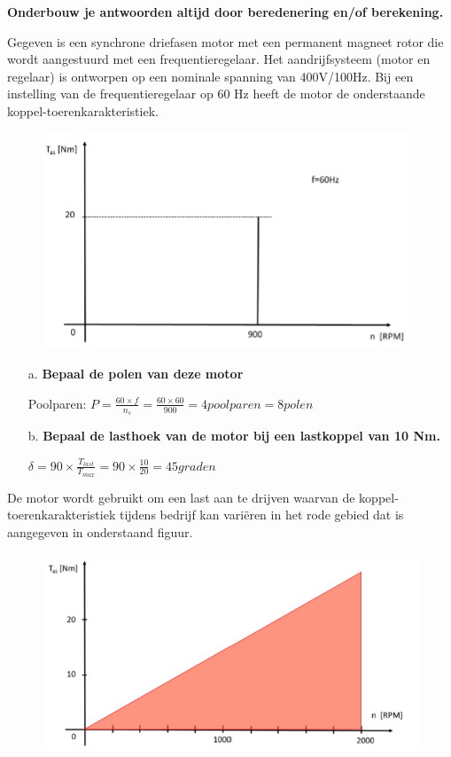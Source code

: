 \textbf{Onderbouw je antwoorden altijd door beredenering en/of berekening.}

Gegeven is een synchrone driefasen motor met een permanent magneet rotor die wordt aangestuurd met een frequentieregelaar. Het aandrijfsysteem (motor en regelaar) is ontworpen op een nominale spanning van 400V/100Hz. Bij een instelling van de frequentieregelaar op 60 Hz heeft de motor de onderstaande
koppel-toerenkarakteristiek.

\begin{figure}[h]
    \centering
    \includegraphics[scale=1.5]{3-uitleg.png}
\end{figure}

\begin{enumerate}
    \item [a.] \textbf{Bepaal de polen van deze motor}
    
        Poolparen:
        $ P = \frac{60 \times f}{n_{s}} = \frac{60 \times 60}{900} = 4 poolparen = 8 polen$

    \item [b.] \textbf{Bepaal de lasthoek van de motor bij een lastkoppel van 10 Nm.}
    
        $ \delta = 90 \times \frac{T_{last}}{T_{max}} = 90 \times \frac{10}{20} = 45 graden$

\end{enumerate}

De motor wordt gebruikt om een last aan te drijven waarvan de koppel-toerenkarakteristiek tijdens bedrijf kan variëren in het rode gebied dat is aangegeven in onderstaand figuur.
\begin{figure}[h]
    \centering
    \includegraphics[scale=1]{3b-uitleg.png}
\end{figure}


